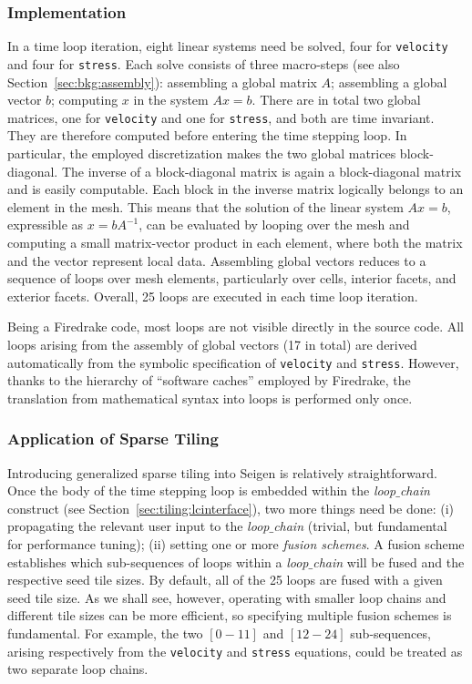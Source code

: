 \subsubsection{Implementation}
In a time loop iteration, eight linear systems need be solved, four for {\tt velocity} and four for {\tt stress}. Each solve consists of three macro-steps (see also Section~\ref{sec:bkg:assembly}): assembling a global matrix $A$; assembling a global vector $b$; computing $x$ in the system $Ax = b$. There are in total two global matrices, one for {\tt velocity} and one for {\tt stress}, and both are time invariant. They are therefore computed before entering the time stepping loop. In particular, the employed discretization makes the two global matrices block-diagonal. The inverse of a block-diagonal matrix is again a block-diagonal matrix and is easily computable. Each block in the inverse matrix logically belongs to an element in the mesh. This means that the solution of the linear system $Ax = b$, expressible as $x = b A^{-1}$, can be evaluated by looping over the mesh and computing a small matrix-vector product in each element, where both the matrix and the vector represent local data. Assembling global vectors reduces to a sequence of loops over mesh elements, particularly over cells, interior facets, and exterior facets. Overall, 25 loops are executed in each time loop iteration.

Being a Firedrake code, most loops are not visible directly in the source code. All loops arising from the assembly of global vectors (17 in total) are derived automatically from the symbolic specification of {\tt velocity} and {\tt stress}. However, thanks to the hierarchy of ``software caches'' employed by Firedrake, the translation from mathematical syntax into loops is performed only once. 

\subsubsection{Application of Sparse Tiling}
Introducing generalized sparse tiling into Seigen is relatively straightforward. Once the body of the time stepping loop is embedded within the {\em loop$\_$chain} construct (see Section~\ref{sec:tiling:lcinterface}), two more things need be done: (i) propagating the relevant user input to the {\em loop$\_$chain} (trivial, but fundamental for performance tuning); (ii) setting one or more {\em fusion schemes}. A fusion scheme establishes which sub-sequences of loops within a {\em loop$\_$chain} will be fused and the respective seed tile sizes. By default, all of the 25 loops are fused with a given seed tile size. As we shall see, however, operating with smaller loop chains and different tile sizes can be more efficient, so specifying multiple fusion schemes is fundamental. For example, the two $[0-11]$ and $[12-24]$ sub-sequences, arising respectively from the {\tt velocity} and {\tt stress} equations, could be treated as two separate loop chains. 

